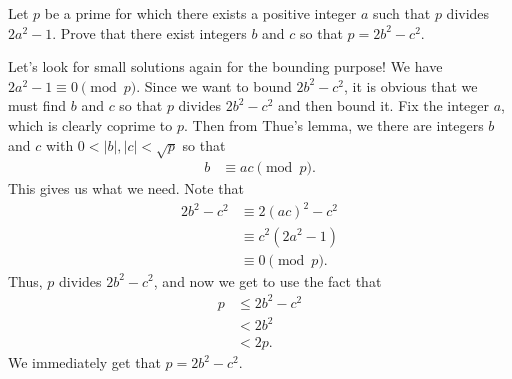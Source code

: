 \documentclass{subfile}
\begin{document}
	\begin{problem}
		Let $p$ be a prime for which there exists a positive integer $a$ such that $p$ divides $2a^2-1$. Prove that there exist integers $b$ and $c$ so that $p=2b^2-c^2$.
	\end{problem}
	
	\begin{solution}
		Let's look for small solutions again for the bounding purpose! We have $2a^2-1\equiv0\pmod p$. Since we want to bound $2b^2-c^2$, it is obvious that we must find $b$ and $c$ so that $p$ divides $2b^2-c^2$ and then bound it. Fix the integer $a$, which is clearly coprime to $p$. Then from Thue's lemma, we there are integers $b$ and $c$ with $0<|b|,|c|<\sqrt{p}$ so that
		\begin{align*}
			b & \equiv ac\pmod p.
		\end{align*}
		This gives us what we need. Note that
		\begin{align*}
			2b^2-c^2 & \equiv 2(ac)^2-c^2\\
			& \equiv c^2(2a^2-1)\\
			& \equiv 0\pmod p.
		\end{align*}
		Thus, $p$ divides $2b^2-c^2$, and now we get to use the fact that
		\begin{align*}
			p & \leq 2b^2-c^2\\ 
			& < 2b^2 \\
			& < 2p.
		\end{align*}
		We immediately get that $p=2b^2-c^2$.
	\end{solution}

	
\end{document}
